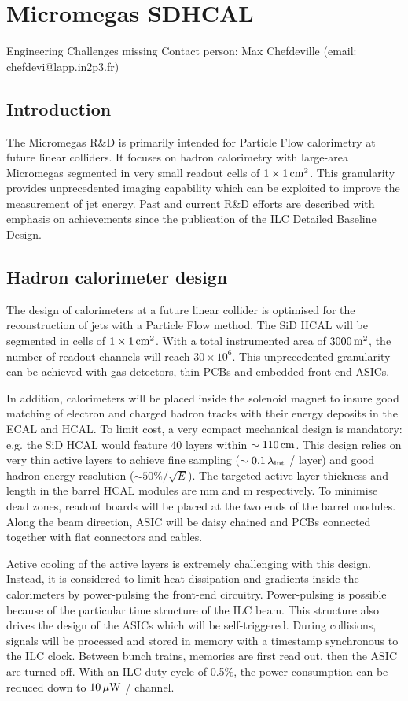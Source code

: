\section{Micromegas SDHCAL}
{\color{red}Engineering Challenges missing}
Contact person: Max Chefdeville (email: chefdevi@lapp.in2p3.fr)
\subsection{Introduction}
The Micromegas R\&D is primarily intended for Particle Flow calorimetry at future linear colliders. It focuses on hadron calorimetry with large-area Micromegas segmented in very small readout cells of $1\times\unit[1]{cm^{2}}$. This granularity provides unprecedented imaging capability which can be exploited to improve the measurement of jet energy. Past and current R\&D efforts are described with emphasis on achievements since the publication of the ILC Detailed Baseline Design.


\subsection{Hadron calorimeter design}

The design of calorimeters at a future linear collider is optimised for the reconstruction of jets with a Particle Flow method. The SiD HCAL will be segmented in cells of $1\times \unit[1]{cm^2}$. With a total instrumented area of $\unit[3000]{m^{2}}$, the number of readout channels will reach $30\times 10^{6}$. This unprecedented granularity can be achieved with gas detectors, thin PCBs and embedded front-end ASICs.

In addition, calorimeters will be placed inside the solenoid magnet to insure good matching of electron and charged hadron tracks with their energy deposits in the ECAL and HCAL. To limit cost, a very compact mechanical design is mandatory: e.g. the SiD HCAL would feature 40 layers within $\sim\unit[110]{cm}$. This design relies on very thin active layers to achieve fine sampling ($\sim\unit[0.1]{\lambda_{int}}$ / layer) and good hadron energy resolution ($\sim 50\% / \sqrt{E}$). The targeted active layer thickness and length in the barrel HCAL modules are \unit[8]{mm} and \unit[3]{m} respectively. To minimise dead zones, readout boards will be placed at the two ends of the barrel modules. Along the beam direction, ASIC will be daisy chained and PCBs connected together with flat connectors and cables.

Active cooling of the active layers is extremely challenging with this design. Instead, it is considered to limit heat dissipation and gradients inside the calorimeters by power-pulsing the front-end circuitry. Power-pulsing is possible because of the particular time structure of the ILC beam. This structure also drives the design of the ASICs which will be self-triggered. During collisions, signals will be processed and stored in memory with a timestamp synchronous to the ILC clock. Between bunch trains, memories are first read out, then the ASIC are turned off. With an ILC duty-cycle of 0.5\%, the power consumption can be reduced down to $\unit[10]{\mu W}$ / channel.

